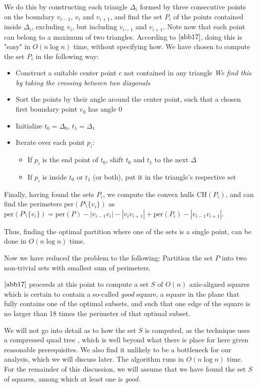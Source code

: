\documentclass{article}
\begin{document}
We do this by constructing each triangle $\Delta_i$ formed by three consecutive points on the boundary $v_{i - 1}$, $v_i$ and $v_{i + 1}$, and find the set $P_i$ of the points contained inside $\Delta_i$, excluding $v_i$, but including $v_{i - 1}$ and $v_{i + 1}$. Note now that each point can belong to a maximum of two triangles. According to $\cite{abb17}$, doing this is "easy" in $O(n \log n)$ time, without specifying how. We have chosen to compute the set $P_i$ in the following way:
\begin{itemize}
    \item Construct a suitable center point $c$ not contained in any triangle \textit{We find this by taking the crossing between two diagonals}
    \item Sort the points by their angle around the center point, such that a chosen first boundary point $v_0$ has angle $0$
    \item Initialize $t_0 = \Delta_0$, $t_1 = \Delta_1$
    \item Iterate over each point $p_i$: \begin{itemize}
        \item If $p_i$ is the end point of $t_0$, shift $t_0$ and $t_1$ to the next $\Delta$
        \item If $p_i$ is inside $t_0$ or $t_1$ (or both), put it in the triangle's respective set
    \end{itemize}
\end{itemize}

Finally, having found the sets $P_i$, we compute the convex hulls $\text{CH}(P_i)$, and can find the perimeters $\text{per}(P \setminus \{v_i\})$ as $\text{per}(P \setminus \{v_i\}) = \text{per}(P) - |v_{i - 1}v_i| - |v_iv_{i + 1}| + \text{per}(P_i) - |v_{i - 1}v_{i + 1}|$.

Thus, finding the optimal partition where one of the sets is a single point, can be done in $O(n \log n)$ time.

Now we have reduced the problem to the following: Partition the set $P$ into two non-trivial sets with smallest sum of perimeters. 

$\cite{abb17}$ proceeds at this point to compute a set $S$ of $O(n)$ axis-aligned squares which is certain to contain a so-called \textit{good} square,  a square in the plane that fully contains one of the optimal subsets, and such that one edge of the square is no larger than 18 times the perimeter of that optimal subset.

We will not go into detail as to how the set $S$ is computed, as the technique uses a compressed quad tree \cite{quad_trees}, which is well beyond what there is place for here given reasonable prerequisites. We also find it unlikely to be a bottleneck for our analysis, which we will discuss later. The algorithm runs in $O(n \log n)$ time. For the remainder of this discussion, we will assume that we have found the set $S$ of squares, among which at least one is \textit{good}.
\end{document}
